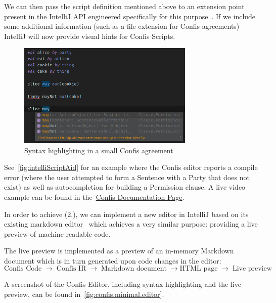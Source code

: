 We can then pass the script definition mentioned above to an extension point present in the IntelliJ API engineered specifically for this purpose~\cite{ideaExtensionPoints, intelliJRepo}.
If we include some additional information (such as a file extension for Confis agreements) IntelliJ will now provide visual hints for Confis Scripts.

\begin{figure}[h]
    \centering
    \includegraphics[width=0.75\textwidth]{figures/minimal.editor.highlighting.confis}
    \caption{Syntax highlighting in a small Confis agreement}
    \label{fig:intelliScriptAid}
\end{figure}

See~\autoref{fig:intelliScriptAid} for an example where the Confis editor reports a compile error (where the user attempted to form a Sentence with a Party that does not exist) as well as autocompletion for building a Permission clause.
A live video example can be found in the~\href{https://confis.dcotta.eu/0.1.1/IDE%20Support/IDEAPlugin/}{Confis Documentation Page}.

In order to achieve (2.), we can implement a new editor in IntelliJ based on its existing markdown editor~\cite{ideaMarkdownPreview} which achieves a very similar purpose: providing a live preview of machine-readable code.

The live preview is implemented as a preview of an in-memory Markdown document which is in turn generated upon code changes in the editor:
\begin{equation*}
    \text{Confis Code}\; \to\; \text{Confis IR}\; \to\; \text{Markdown document}\; \to \text{HTML page}\; \to\; \text{Live preview}
\end{equation*}

A screenshot of the Confis Editor, including syntax highlighting and the live preview, can be found in~\autoref{fig:confis.minimal.editor}.

